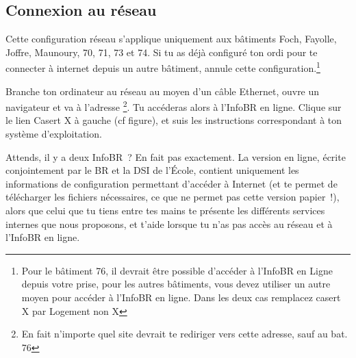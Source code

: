 
\subsection{Connexion au réseau}

Cette configuration réseau s'applique uniquement aux bâtiments Foch, Fayolle, Joffre, Maunoury, 70, 71, 73 et 74. Si tu as déjà configuré ton ordi pour te connecter à internet depuis un autre bâtiment, annule cette configuration.\footnote{Pour le bâtiment 76, il devrait être possible d'accéder à l'InfoBR en Ligne depuis votre prise, pour les autres bâtiments, vous devez utiliser un autre moyen pour accéder à l'InfoBR en ligne. Dans les deux cas remplacez casert X par Logement non X}

Branche ton ordinateur au réseau au moyen d'un câble Ethernet, ouvre un navigateur et va à l'adresse \footnote{En fait n'importe quel site devrait te rediriger vers cette adresse, sauf au bat. 76}. Tu accéderas alors à l'InfoBR en ligne. Clique sur le lien Casert X à gauche (cf figure), et suis les instructions correspondant à ton système d'exploitation.

Attends, il y a deux InfoBR~? En fait pas exactement. La version en ligne, écrite conjointement par le BR et la DSI de l'École,  contient uniquement les informations de configuration permettant d'accéder à Internet (et te permet de télécharger les fichiers nécessaires, ce que ne permet pas cette version papier~!), alors que celui que tu tiens entre tes mains te présente les différents services internes que nous proposons, et t'aide lorsque tu n'as pas accès au réseau et à l'InfoBR en ligne.


